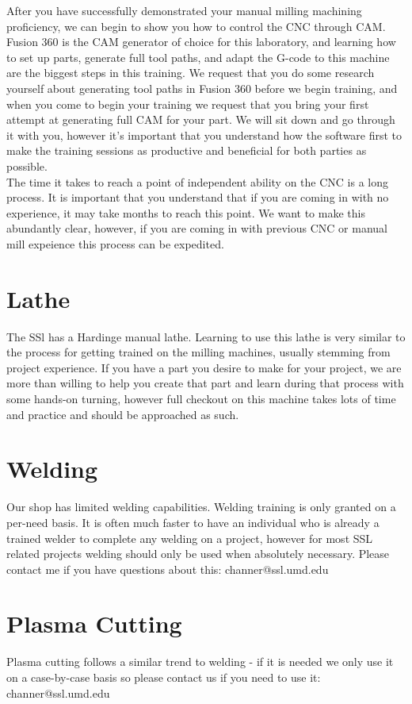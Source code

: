 \documentclass{article}
\begin{document}
After you have successfully demonstrated your manual milling machining proficiency, we can begin to show you how to control the CNC through CAM. Fusion 360 is the CAM generator of choice for this laboratory, and learning how to set up parts, generate full tool paths, and adapt the G-code to this machine are the biggest steps in this training. We request that you do some research yourself about generating tool paths in Fusion 360 before we begin training, and when you come to begin your training we request that you bring your first attempt at generating full CAM for your part. We will sit down and go through it with you, however it's important that you understand how the software first to make the training sessions as productive and beneficial for both parties as possible. \\

The time it takes to reach a point of independent ability on the CNC is a long process. It is important that you understand that if you are coming in with no experience, it may take months to reach this point. We want to make this abundantly clear, however, if you are coming in with previous CNC or manual mill expeience this process can be expedited. 

\section{Lathe}

The SSl has a Hardinge manual lathe. Learning to use this lathe is very similar to the process for getting trained on the milling machines, usually stemming from project experience. If you have a part you desire to make for your project, we are more than willing to help you create that part and learn during that process with some hands-on turning, however full checkout on this machine takes lots of time and practice and should be approached as such. 

\section{Welding}
Our shop has limited welding capabilities. Welding training is only granted on a per-need basis. It is often much faster to have an individual who is already a trained welder to complete any welding on a project, however for most SSL related projects welding should only be used when absolutely necessary. Please contact me if you have questions about this: channer@ssl.umd.edu

\section{Plasma Cutting}
Plasma cutting follows a similar trend to welding - if it is needed we only use it on a case-by-case basis so please contact us if you need to use it: channer@ssl.umd.edu
\end{document}
